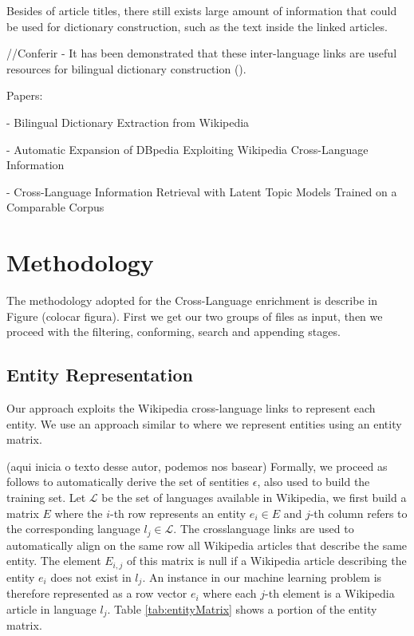 \documentclass[10pt,a4paper]{llncs}
\begin{document}
Besides of article titles, there still exists large amount of information that could be used for dictionary construction, such as the text inside the linked articles.

//Conferir - It has been demonstrated that these inter-language links are useful resources for bilingual dictionary construction (\cite{erdmann}).

Papers:

- Bilingual Dictionary Extraction from Wikipedia

- Automatic Expansion of DBpedia Exploiting Wikipedia Cross-Language Information

- Cross-Language Information Retrieval with Latent Topic Models Trained on a Comparable Corpus

\section{Methodology}

The methodology adopted for the Cross-Language enrichment is describe in Figure (colocar figura). First we get our two groups of files as input, then we proceed with the filtering, conforming, search and appending stages.

\subsection{Entity Representation}

Our approach exploits the Wikipedia cross-language links to represent each entity. We use an approach similar to \cite{aprosio} where we represent entities using an entity matrix. 

(aqui inicia o texto desse autor, podemos nos basear)
Formally, we proceed as follows to automatically derive the set of sentities $\epsilon$, also used to build the training set. Let $\mathcal{L}$ be the set of languages available in Wikipedia, we first build a matrix $E$ where the $i$-th row represents an entity $e_i \in E$ and $j$-th column refers to the corresponding language $l_j \in \mathcal{L}$. The crosslanguage links are used to automatically align on the same row all Wikipedia articles that describe the same entity. The element $E_{i,j}$ of this matrix is null if a Wikipedia article describing the entity $e_i$ does not exist in $l_j$. An instance in our machine learning problem is therefore represented as a row vector $e_i$ where each $j$-th element is a Wikipedia article in language $l_j$. Table \ref{tab:entityMatrix} shows a portion of the entity matrix.
\end{document}
